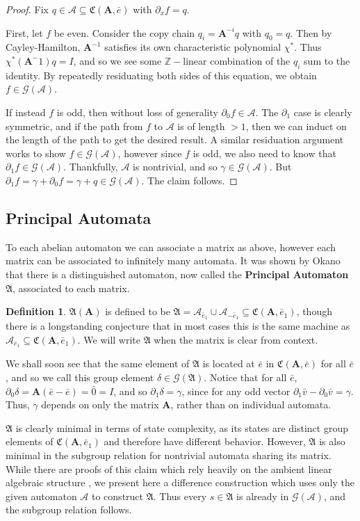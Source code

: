 \documentclass{article}
\newcommand{\A}{\mathcal{A}}
\newcommand{\G}{\mathcal{G}}
\renewcommand{\P}{\mathfrak{A}}
\newcommand{\C}{\mathfrak{C}(\Am,\e)}
\newcommand{\Z}{\mathbb{Z}}
\newcommand{\2}{\textbf{2}}
\newcommand{\Am}{\textbf{A}}
\newcommand{\del}{\partial}
\newcommand{\vv}{\bar{v}}
\newcommand{\e}{\bar{e}}
\theoremstyle{definition}
\newtheorem{defn}{Definition}
\begin{document}
\begin{proof}
  Fix $q \in \A \subseteq \C$ with $\del_x f = q$. 

  First, let $f$ be even. Consider the copy chain $q_i = \Am^{-i}q$ with 
  $q_0 = q$. Then by Cayley-Hamilton, $\Am^{-1}$ satisfies its own 
  characteristic polynomial $\chi^*$. Thus $\chi^*(\Am^-1)q = I$, and
  so we see some $\Z-$linear combination of the $q_i$ sum to the identity.
  By repeatedly residuating both sides of this equation, we obtain 
  $f \in \G(\A)$.

  If instead $f$ is odd, then without loss of generality $\del_0 f \in \A$.
  The $\del_1$ case is clearly symmetric, and if the path from $f$ to $\A$ 
  is of length $>1$, then we can induct on the length of the path to get the
  desired result. A similar residuation argument works to show $f \in \G(\A)$, 
  however since $f$ is odd, we also need to know that $\del_1 f \in \G(\A)$. 
  Thankfully, $\A$ is nontrivial, and so $\gamma \in \G(\A)$. But
  $\del_1 f = \gamma + \del_0 f = \gamma + q \in \G(\A)$. The claim follows.
\end{proof}

\subsection{Principal Automata}
To each abelian automaton we can associate a matrix as above, however each
matrix can be associated to infinitely many automata.
It was shown by Okano \cite{Okano15:thesis} that there is a 
distinguished automaton, now called the \textbf{Principal Automaton} $\P$, 
associated to each matrix. 

\begin{defn}
  $\P(\Am)$ is defined to be 
  $\P = \A_{\e_1} \cup \A_{-\e_1} \subseteq \mathfrak{C}(\Am, \e_1)$,
  though there is a longstanding conjecture that in most cases this is
  the same machine as $\A_{\e_1} \subseteq \mathfrak{C}(\Am, \e_1)$.
  We will write $\P$ when the matrix is clear from context. 
\end{defn}

We shall soon see that the same element of $\P$ is located at $\e$ in 
$\C$ for all $\e$, and so we call this group element $\delta \in \G(\P)$. 
Notice that for all $\e$, $\del_0 \delta = \Am(\e - \e) = \bar{0} = I$, and so
$\del_1 \delta = \gamma$, since for any odd vector 
$\del_1 \vv - \del_0 \vv = \gamma$. Thus, $\gamma$ depends on only the 
matrix $\Am$, rather than on individual automata.

$\P$ is clearly minimal in terms of state complexity, as its states are
distinct group elements of $\mathfrak{C}(\Am, \e_1)$ and therefore 
have different behavior. However, $\P$ is also minimal in the
subgroup relation for nontrivial automata sharing its matrix. 
While there are proofs of this claim which rely heavily on the
ambient linear algebraic structure \cite{Okano15:thesis}, 
we present here a difference construction which uses only the given 
automaton $\A$ to construct $\P$. Thus every $s \in \P$ is already in
$\G(\A)$, and the subgroup relation follows.
\end{document}
